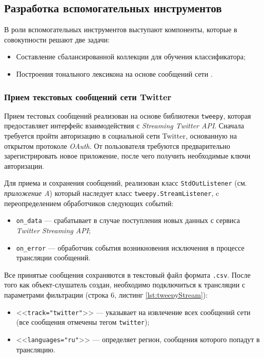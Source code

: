\subsection{Разработка вспомогательных инструментов} %
В роли вспомогательных инструментов выступают компоненты, которые в совокупности
решают две задачи:
\begin{itemize}
    \item Составление сбалансированной коллекции для обучения классификатора;
    \item Построения тонального лексикона на основе сообщений сети \twitter.
\end{itemize}


    \subsubsection{Прием текстовых сообщений сети Twitter}
    Прием тестовых сообщений реализован на основе библиотеки {\tt tweepy}, которая
    предоставляет интерфейс взаимодействия с {\it Streaming Twitter API}.
    Сначала требуется пройти авторизацию в социальной сети Twitter, основанную
    на открытом протоколе {\it OAuth}.
    От пользователя требуются предварительно зарегистрировать новое приложение,
    после чего получить необходимые ключи авторизации.

    Для приема и сохранения сообщений, реализован класс {\tt StdOutListener}
    (см. {\it приложение A}) который  наследует класс {\tt tweepy.StreamListener},
    c переопределением обработчиков следующих событий:
    \begin{itemize}
        \item {\tt on\_data} --- срабатывает в случае поступления новых данных
        с сервиса {\it Twitter Streaming API};
        \item {\tt on\_error} --- обработчик события возникновения исключения
        в процессе трансляции сообщений.
    \end{itemize}

    Все принятые сообщения сохраняются в текстовый файл формата {\tt .csv}.
    После того как объект-слушатель создан, необходимо подключиться к трансляции
    с параметрами фильтрации (строка 6, листинг \ref{lst:tweepyStream}):
    \begin{itemize}
        \item <<{\tt track=\lbrack"twitter"\rbrack}>> --- указывает на
        извлечение всех сообщений сети (все сообщения отмечены тегом
        {\tt twitter});
        \item <<{\tt languages=\lbrack"ru"\rbrack}>> --- определяет регион,
        сообщения которого попадут в трансляцию.
    \end{itemize}

